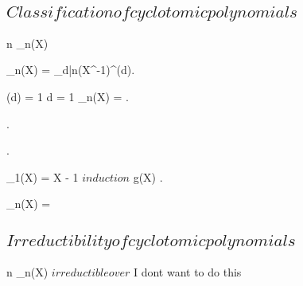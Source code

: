 \documentclass[a5paper]{book}
\begin{document}
{	\subsection{ $ Classification of cyclotomic polynomials $ }
	
	{
		n \in \N
	}
	\proposition
	{
		\Phi_n(X) \in \Z[X]
	}
	\demonstration
	{
		\Phi_n(X) = \prod_{d|n}(X^{}-1)^{\mu(d)}.

		\mu(d) = 1 \ifandonlyif d = 1 \imp \Phi_n(X) = .

		.

		.

		\Phi_1(X) = X - 1 \in \Z[X] \imp $ induction $ \imp g(X) \in \Z[X].

		\imp \Phi_n(X) =  \in \Z[X]
	}
	\newpage

	\subsection{ $ Irreductibility of cyclotomic polynomials $ }
	
	{
		n \in \N
	}
	\proposition
	{
		\Phi_n(X) $ irreductible over $ \Q[X]
	}
	\demonstration
	{
		I dont want to do this
	}
	\newpage
}
\end{document}

